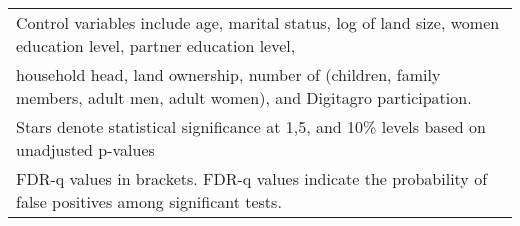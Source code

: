 {\begin{tabular}{l*{7}{c}}
\multicolumn{8}{l}{\footnotesize Control variables include age, marital status, log of land size, women education level, partner education level,}\\
\multicolumn{8}{l}{\footnotesize household head, land ownership, number of (children, family members, adult men, adult women), and Digitagro participation.}\\
\multicolumn{8}{l}{\footnotesize Stars denote statistical significance at 1,5, and 10\% levels based on unadjusted p-values}\\
\multicolumn{8}{l}{\footnotesize FDR-q values in brackets. FDR-q values indicate the probability of false positives among significant tests.}\\
\end{tabular}
}
